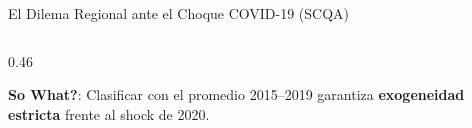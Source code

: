 \begin{frame}{El Dilema Regional ante el Choque COVID-19 (SCQA)}
\begin{columns}[T,onlytextwidth]
\begin{column}{0.46\textwidth}
\vspace{0.05cm}
\begin{keybox}[left=2mm,right=2mm,top=0.9mm,bottom=0.9mm]
\scriptsize\RaggedRight \textbf{So What?}: Clasificar con el promedio 2015--2019 garantiza \textbf{exogeneidad estricta} frente al shock de 2020.
\end{keybox}
\end{column}
\end{columns}
\end{frame}

